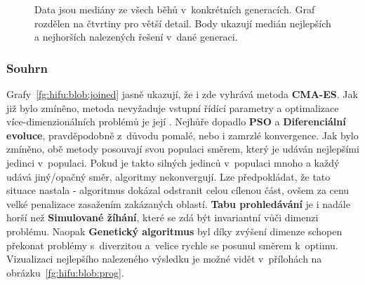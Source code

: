 \begin{figure}[H]
{\begin{tabular}{cc}
    \end{tabular}
    }
    \caption{Data jsou mediány ze všech běhů v~konkrétních generacích. Graf rozdělen na čtvrtiny pro větší detail. Body ukazují medián nejlepších a nejhorších nalezených řešení v~dané generaci.}
    \label{fg:hifu:blob:cmaes:evoProg}
\end{figure}

\subsubsection{Souhrn}
Grafy~\ref{fg:hifu:blob:joined} jasně ukazují, že i zde vyhrává metoda \textbf{CMA-ES}. Jak již bylo zmíněno, metoda nevyžaduje vstupní řídící parametry a optimalizace více-dimenzionálních problémů je její . Nejhůře dopadlo \textbf{PSO} a \textbf{Diferenciální evoluce}, pravděpodobně z~důvodu pomalé, nebo i zamrzlé konvergence. Jak bylo zmíněno, obě metody posouvají svou populaci směrem, který je udáván nejlepšími jedinci v~populaci. Pokud je takto silných jedinců v~populaci mnoho a každý udává jiný/opačný směr, algoritmy nekonvergují. Lze předpokládat, že tato situace nastala - algoritmus dokázal odstranit celou cílenou část, ovšem za cenu velké penalizace zasažením zakázaných oblastí. \textbf{Tabu prohledávání} je i nadále horší než \textbf{Simulované žíhání}, které se zdá být invariantní vůči dimenzi problému. Naopak \textbf{Genetický algoritmus} byl díky zvýšení dimenze schopen překonat problémy s~diverzitou a~velice rychle se posunul směrem k~optimu. 
Vizualizaci nejlepšího nalezeného výsledku je možné vidět v~přílohách na obrázku~\ref{fg:hifu:blob:prog}.

